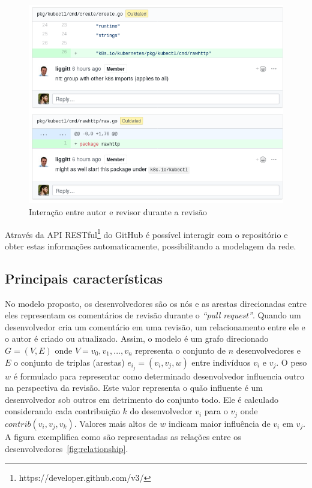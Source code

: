 \documentclass[12pt,openany,oneside,a4paper,english,brazil]{abntbibufjf}
\begin{document}
\begin{figure}[htbp]
 \includegraphics[width=\textwidth]{comment-codereview}
 \caption{Interação entre autor e revisor durante a revisão}\label{fig:comment-codereview}
\end{figure}

Através da API RESTful\footnote{https://developer.github.com/v3/} do GitHub é possível interagir com o repositório e obter estas informações automaticamente, possibilitando a modelagem da rede.

\subsection{Principais características}
No modelo proposto, os desenvolvedores são os nós e as arestas direcionadas entre eles representam os comentários de revisão durante o \textit{``pull request''}. Quando um desenvolvedor cria um comentário em uma revisão, um relacionamento entre ele e o autor é criado ou atualizado. Assim, o modelo é um grafo direcionado $ G = (V, E) $ onde $ V ={v_0, v_1, ... , v_n} $ representa o conjunto de $n$ desenvolvedores e $E$ o conjunto de triplas (arestas) $e_i_j = (v_i, v_j, w)$ entre indivíduos $v_i$ e $v_j$. O peso $w$ é formulado para representar como determinado desenvolvedor influencia outro na perspectiva da revisão. Este valor representa o quão influente é um desenvolvedor sob outros em detrimento do conjunto todo. Ele é calculado considerando cada contribuição $k$ do desenvolvedor $v_i$ para o $v_j$ onde $contrib(v_i,v_j,v_k)$. Valores mais altos de $w$ indicam maior influência de $v_i$ em $v_j$. A figura exemplifica como são representadas as relações entre os desenvolvedores~\ref{fig:relationship}.
\end{document}
